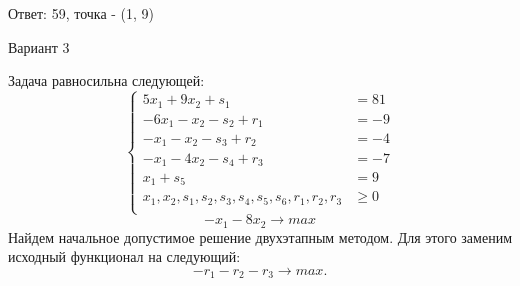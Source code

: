 \documentclass{article}%
\begin{document}
\begin{flushright}%
Ответ: 59, точка {-} (1, 9)%
\end{flushright}%
\newpage%
\begin{center}%
\begin{Huge}%
Вариант 3%
\end{Huge}%
\end{center}%
Задача равносильна следующей: %
\[%
\left\{\begin{aligned}5x_{1}+9x_{2}+s_{1} & =81 \\-6x_{1}-x_{2}-s_{2}+r_{1} & =-9 \\-x_{1}-x_{2}-s_{3}+r_{2} & =-4 \\-x_{1}-4x_{2}-s_{4}+r_{3} & =-7 \\x_{1}+s_{5} & =9 \\x_{1},x_{2},s_{1},s_{2},s_{3},s_{4},s_{5},s_{6},r_{1},r_{2},r_{3} & \ge 0 \\ \end{aligned}\right.%
\]%
\[%
-x_{1}-8x_{2}  \to max%
\]%
Найдем начальное допустимое решение двухэтапным методом. Для этого заменим исходный функционал на следующий: %
\[%
-r_{1}-r_{2}-r_{3}\to max.%
\]%
\end{document}

